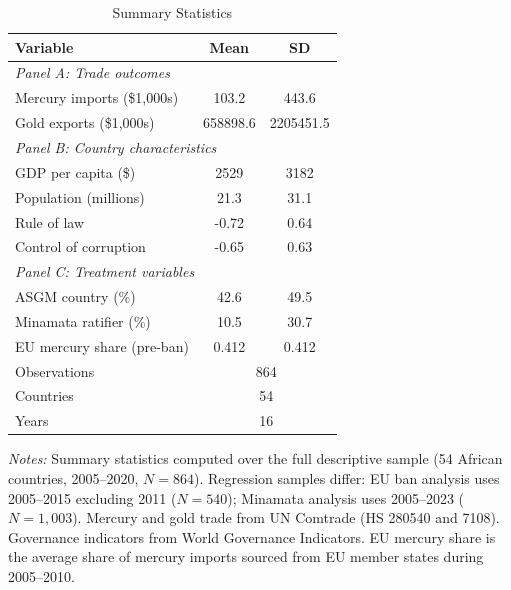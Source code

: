 \begin{table}[htbp]
\centering
\caption{Summary Statistics}
\label{tab:summary}
\begin{tabular}{lcc}
\hline\hline
Variable & Mean & SD \\
\hline
\multicolumn{3}{l}{\textit{Panel A: Trade outcomes}} \\
Mercury imports (\$1,000s) & 103.2 & 443.6 \\
Gold exports (\$1,000s) & 658898.6 & 2205451.5 \\
\hline
\multicolumn{3}{l}{\textit{Panel B: Country characteristics}} \\
GDP per capita (\$) & 2529 & 3182 \\
Population (millions) & 21.3 & 31.1 \\
Rule of law & -0.72 & 0.64 \\
Control of corruption & -0.65 & 0.63 \\
\hline
\multicolumn{3}{l}{\textit{Panel C: Treatment variables}} \\
ASGM country (\%) & 42.6 & 49.5 \\
Minamata ratifier (\%) & 10.5 & 30.7 \\
EU mercury share (pre-ban) & 0.412 & 0.412 \\
\hline
Observations & \multicolumn{2}{c}{864} \\
Countries & \multicolumn{2}{c}{54} \\
Years & \multicolumn{2}{c}{16} \\
\hline\hline
\end{tabular}
\begin{tablenotes}[flushleft]\small
\item \textit{Notes:} Summary statistics computed over the full descriptive sample (54 African countries, 2005--2020, $N=864$). Regression samples differ: EU ban analysis uses 2005--2015 excluding 2011 ($N=540$); Minamata analysis uses 2005--2023 ($N=1{,}003$). Mercury and gold trade from UN Comtrade (HS 280540 and 7108). Governance indicators from World Governance Indicators. EU mercury share is the average share of mercury imports sourced from EU member states during 2005--2010.
\end{tablenotes}
\end{table}
